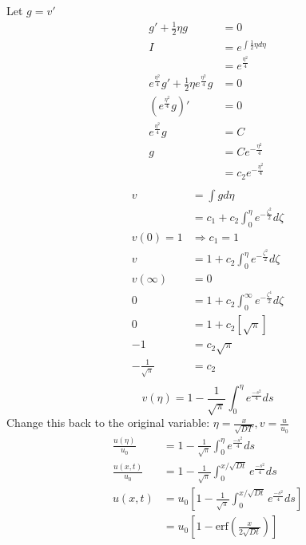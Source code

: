 \documentclass[
	date={September 4{,} 2024}
]{math486notes}
\begin{document}
Let $g = v'$
\begin{equation*}
\begin{aligned}
	g' + \frac{1}{2}\eta g &= 0\\
	I &= e^{\int \frac{1}{2}\eta d\eta}\\
	  &= e^{\frac{\eta^{2}}{4}}\\
	e^{\frac{\eta^{2}}{4}}g' + \frac{1}{2}\eta e^{\frac{\eta^{2}}{4}}g &= 0 \\
	\left( e^{\frac{\eta^{2}}{4}}g \right)' &= 0\\
	e^{\frac{\eta^{2}}{4}}g &= C\\
	g &= Ce^{-\frac{\eta^{2}}{4}}\\
	  &= c_{2}e^{-\frac{\eta^{2}}{4}}\\
\end{aligned}
\end{equation*}
\begin{equation*}
\begin{aligned}
	v &= \int g d\eta\\
	  &= c_{1} + c_{2}\int_{0}^{\eta} e^{-\frac{\zeta^{2}}{2}}d\zeta\\ %
	v(0) = 1 &\Rightarrow c_{1} = 1\\
	v &= 1 + c_{2}\int_{0}^{\eta} e^{-\frac{\zeta^{2}}{2}}d\zeta\\
	v(\infty) &= 0\\
	0 &= 1 + c_{2}\int_{0}^{\infty} e^{-\frac{\zeta^{4}}{2}}d\zeta\\
	0 &= 1 + c_{2}[ \sqrt{\pi} ]\\
	-1 &= c_{2}\sqrt{\pi}\\
	-\frac{1}{\sqrt{\pi}} &= c_{2}\\
\end{aligned}
\end{equation*}
\[	v(\eta) = 1 - \frac{1}{\sqrt{\pi}}\int_{0}^{\eta}e^{\frac{-s^{2}}{4}} ds \]
Change this back to the original variable: $\eta = \frac{x}{\sqrt{DT}}, v = \frac{u}{u_{0}}$
\begin{equation*}
\begin{aligned}
	\frac{u(\eta)}{u_{0}} &= 1 - \frac{1}{\sqrt{\pi}}\int_{0}^{\eta}e^{\frac{-s^{2}}{4}} ds\\
	\frac{u(x, t)}{u_{0}} &= 1 - \frac{1}{\sqrt{\pi}}\int_{0}^{x/\sqrt{Dt}}e^{\frac{-s^{2}}{4}} ds\\
	u(x, t) &= u_{0}\left[ 1 - \frac{1}{\sqrt{\pi}}\int_{0}^{x/\sqrt{Dt}}e^{\frac{-s^{2}}{4}} ds \right]\\
			&= u_{0}\left[ 1 - \mbox{erf}\left( \frac{x}{2\sqrt{Dt}} \right) \right]\\
\end{aligned}
\end{equation*}
\end{document}
